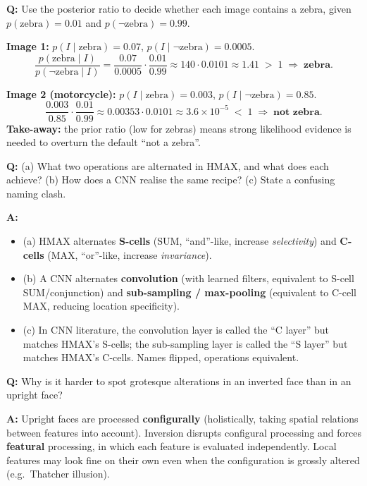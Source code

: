 \begin{exbox}
\textbf{Q:} Use the posterior ratio to decide whether each image contains a zebra, given $p(\text{zebra}) = 0.01$ and $p(\neg\text{zebra}) = 0.99$.

\textbf{Image 1:} $p(I\mid\text{zebra}) = 0.07$, $p(I\mid\neg\text{zebra}) = 0.0005$.
\[
\frac{p(\text{zebra}\mid I)}{p(\neg\text{zebra}\mid I)}
= \frac{0.07}{0.0005} \cdot \frac{0.01}{0.99}
\approx 140 \cdot 0.0101 \approx 1.41 \;>\; 1 \;\Rightarrow\; \textbf{zebra}.
\]

\textbf{Image 2 (motorcycle):} $p(I\mid\text{zebra}) = 0.003$, $p(I\mid\neg\text{zebra}) = 0.85$.
\[
\frac{0.003}{0.85} \cdot \frac{0.01}{0.99}
\approx 0.00353 \cdot 0.0101 \approx 3.6\times 10^{-5} \;<\; 1 \;\Rightarrow\; \textbf{not zebra}.
\]
\textbf{Take-away:} the prior ratio (low for zebras) means strong likelihood evidence is needed to overturn the default ``not a zebra''.
\end{exbox}

\begin{exbox}
\textbf{Q:} (a) What two operations are alternated in HMAX, and what does each achieve? (b) How does a CNN realise the same recipe? (c) State a confusing naming clash.

\textbf{A:}
\begin{itemize}
  \item (a) HMAX alternates \textbf{S-cells} (SUM, ``and''-like, increase \emph{selectivity}) and \textbf{C-cells} (MAX, ``or''-like, increase \emph{invariance}).
  \item (b) A CNN alternates \textbf{convolution} (with learned filters, equivalent to S-cell SUM/conjunction) and \textbf{sub-sampling / max-pooling} (equivalent to C-cell MAX, reducing location specificity).
  \item (c) In CNN literature, the convolution layer is called the ``C layer'' but matches HMAX's S-cells; the sub-sampling layer is called the ``S layer'' but matches HMAX's C-cells. Names flipped, operations equivalent.
\end{itemize}
\end{exbox}

\begin{exbox}
\textbf{Q:} Why is it harder to spot grotesque alterations in an inverted face than in an upright face?

\textbf{A:} Upright faces are processed \textbf{configurally} (holistically, taking spatial relations between features into account). Inversion disrupts configural processing and forces \textbf{featural} processing, in which each feature is evaluated independently. Local features may look fine on their own even when the configuration is grossly altered (e.g.\ Thatcher illusion).
\end{exbox}

